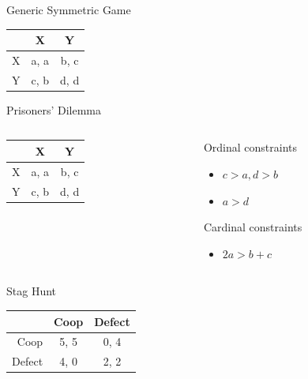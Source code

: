 \documentclass[
  14pt,
  letterpaper,
  ignorenonframetext,
  aspectratio=169,
  handout]{beamer}
\providecommand{\tightlist}{%
  \setlength{\itemsep}{0pt}\setlength{\parskip}{0pt}}\usepackage{longtable,booktabs,array}
\let\olditem\item
\renewcommand{\item}{%
\olditem\vspace{6pt}}
\begin{document}
\begin{frame}[fragile]{Generic Symmetric Game}
\protect\hypertarget{generic-symmetric-game}{}
\begin{table}[!h]
\centering
\begin{tabular}[t]{>{}r|cc}
\toprule
 & X & Y\\
\midrule
X & a, a & b, c\\
Y & c, b & d, d\\
\bottomrule
\end{tabular}
\end{table}
\end{frame}

\begin{frame}[fragile]{Prisoners' Dilemma}
\protect\hypertarget{prisoners-dilemma-1}{}
\begin{columns}[T]
\begin{column}{0.4\textwidth}
\begin{table}[!h]
\centering
\begin{tabular}[t]{>{}r|cc}
\toprule
 & X & Y\\
\midrule
X & a, a & b, c\\
Y & c, b & d, d\\
\bottomrule
\end{tabular}
\end{table}
\end{column}

\begin{column}{0.6\textwidth}
Ordinal constraints

\begin{itemize}
\tightlist
\item
  \(c > a, d > b\)
\item
  \(a > d\)
\end{itemize}

Cardinal constraints

\begin{itemize}
\tightlist
\item
  \(2a > b + c\)
\end{itemize}
\end{column}
\end{columns}
\end{frame}

\begin{frame}[fragile]{Stag Hunt}
\protect\hypertarget{stag-hunt}{}
\begin{table}[!h]
\centering
\begin{tabular}[t]{>{}r|cc}
\toprule
 & Coop & Defect\\
\midrule
Coop & 5, 5 & 0, 4\\
Defect & 4, 0 & 2, 2\\
\bottomrule
\end{tabular}
\end{table}
\end{frame}
\end{document}
